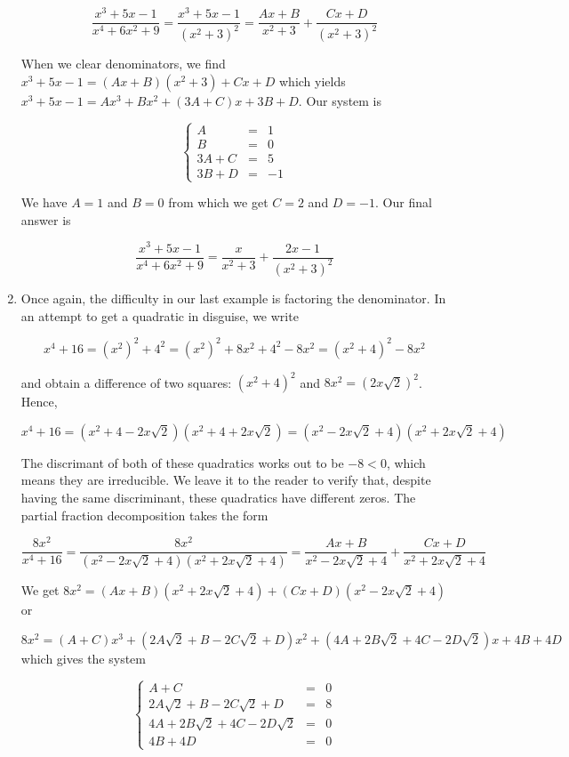\begin{ex}
\begin{enumerate}
\[ \dfrac{x^3+5x-1}{x^4+6x^2+9} =  \dfrac{x^3+5x-1}{\left(x^2+3\right)^2} = \dfrac{Ax+B}{x^2+3} + \dfrac{Cx+D}{\left(x^2+3\right)^2}\]

When we clear denominators, we find $x^3 + 5x-1 = (Ax+B)\left(x^2+3\right) + Cx + D$ which yields $x^3+5x-1 = Ax^3 + Bx^2 + (3A+C)x + 3B+D$.  Our system is 

\[ \left\{ \begin{array}{rcr} A & = & 1 \\ B & = & 0 \\ 3A + C & = & 5 \\ 3B+D & = & -1 \end{array} \right.\]

We have $A = 1$ and $B = 0$ from which we get $C = 2$ and $D = -1$.  Our final answer is

\[ \dfrac{x^3+5x-1}{x^4+6x^2+9} = \dfrac{x}{x^2+3} + \dfrac{2x-1}{\left(x^2+3\right)^2}\]

\item  Once again, the difficulty in our last example is factoring the denominator.  In an attempt to get a quadratic in disguise, we write 

\[x^4 + 16 = \left(x^2\right)^2 + 4^2 = \left(x^2\right)^2 + 8x^2 + 4^2 - 8x^2 = \left(x^2+4\right)^2 - 8x^2\]

and obtain a difference of two squares:  $\left(x^2+4\right)^2$ and $8x^2 = \left(2x\sqrt{2}\right)^2$.  Hence,

\[x^4 + 16 = \left(x^2 + 4 - 2x\sqrt{2}\right)\left(x^2 + 4 + 2x\sqrt{2}\right) =\left(x^2 - 2x\sqrt{2} + 4\right)\left(x^2 + 2x\sqrt{2}+4 \right)  \]

The discrimant of both of these quadratics works out to be $-8 < 0$, which means they are irreducible.  We leave it to the reader to verify that, despite having the same discriminant, these quadratics have different zeros.  The partial fraction decomposition takes the form

\[ \dfrac{8x^2}{x^4+16} = \dfrac{8x^2}{\left(x^2 - 2x\sqrt{2} + 4\right)\left(x^2 + 2x\sqrt{2}+4 \right)} = \dfrac{Ax+B}{x^2 - 2x\sqrt{2} + 4} + \dfrac{Cx+D}{x^2 + 2x\sqrt{2} + 4}\]

We get $8x^2 = (Ax+B)\left(x^2 + 2x\sqrt{2}+4 \right) + (Cx+D)\left(x^2 - 2x\sqrt{2} + 4\right)$ or 

\[8x^2 = (A+C)x^3 + (2A\sqrt{2} + B - 2C\sqrt{2}+D)x^2 + (4A + 2B\sqrt{2}+4C - 2D\sqrt{2})x + 4B + 4D \] which gives the system

\[ \left\{ \begin{array}{rcr} A + C & = & 0 \\ 2A\sqrt{2} + B - 2C\sqrt{2}+D & = & 8 \\ 4A + 2B\sqrt{2}+4C - 2D\sqrt{2} & = & 0 \\ 4B + 4D  & = & 0 \end{array} \right.\]


\end{enumerate}
\end{ex}
